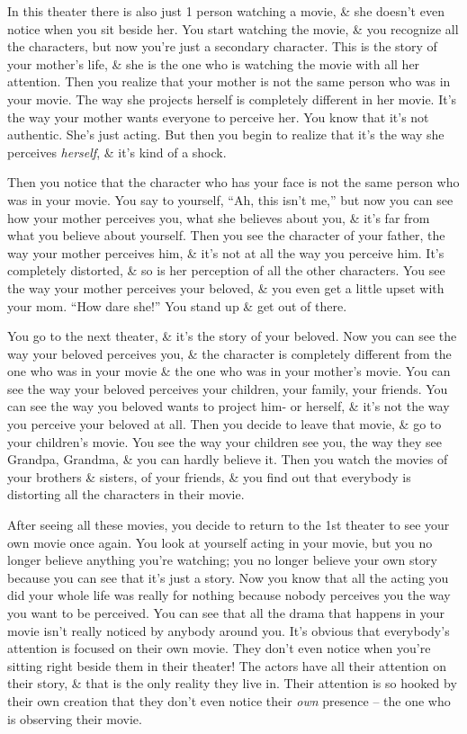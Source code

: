 \documentclass{article}
\numberwithin{equation}{section}
\begin{document}
In this theater there is also just 1 person watching a movie, \& she doesn't even notice when you sit beside her. You start watching the movie, \& you recognize all the characters, but now you're just a secondary character. This is the story of your mother's life, \& she is the one who is watching the movie with all her attention. Then you realize that your mother is not the same person who was in your movie. The way she projects herself is completely different in her movie. It's the way your mother wants everyone to perceive her. You know that it's not authentic. She's just acting. But then you begin to realize that it's the way she perceives \textit{herself}, \& it's kind of a shock.

Then you notice that the character who has your face is not the same person who was in your movie. You say to yourself, ``Ah, this isn't me,'' but now you can see how your mother perceives you, what she believes about you, \& it's far from what you believe about yourself. Then you see the character of your father, the way your mother perceives him, \& it's not at all the way you perceive him. It's completely distorted, \& so is her perception of all the other characters. You see the way your mother perceives your beloved, \& you even get a little upset with your mom. ``How dare she!'' You stand up \& get out of there.

You go to the next theater, \& it's the story of your beloved. Now you can see the way your beloved perceives you, \& the character is completely different from the one who was in your movie \& the one who was in your mother's movie. You can see the way your beloved perceives your children, your family, your friends. You can see the way you beloved wants to project him- or herself, \& it's not the way you perceive your beloved at all. Then you decide to leave that movie, \& go to your children's movie. You see the way your children see you, the way they see Grandpa, Grandma, \& you can hardly believe it. Then you watch the movies of your brothers \& sisters, of your friends, \& you find out that everybody is distorting all the characters in their movie.

After seeing all these movies, you decide to return to the 1st theater to see your own movie once again. You look at yourself acting in your movie, but you no longer believe anything you're watching; you no longer believe your own story because you can see that it's just a story. Now you know that all the acting you did your whole life was really for nothing because nobody perceives you the way you want to be perceived. You can see that all the drama that happens in your movie isn't really noticed by anybody around you. It's obvious that everybody's attention is focused on their own movie. They don't even notice when you're sitting right beside them in their theater! The actors have all their attention on their story, \& that is the only reality they live in. Their attention is so hooked by their own creation that they don't even notice their \textit{own} presence -- the one who is observing their movie.
\end{document}

